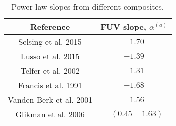 \begin{table}
\centering
\begin{center}
\caption{Power law slopes from different composites.}

\begin{tabular}{cc}
\hline
\noalign{\smallskip}
Reference &  FUV slope, $\alpha$$^{(a)}$ \\  
\hline


Selsing et al. 2015  & $-1.70$   \\
Lusso et al. 2015  & $-1.39$   \\
Telfer et al. 2002  & $-1.31$   \\
Francis et al. 1991  & $-1.68 $   \\

Vanden Berk et al. 2001  & $-1.56$   \\
Glikman et al. 2006 & $-(0.45 - 1.63)$   \\
\hline
\hline
\end{tabular}
\end{center}


\end{table}



